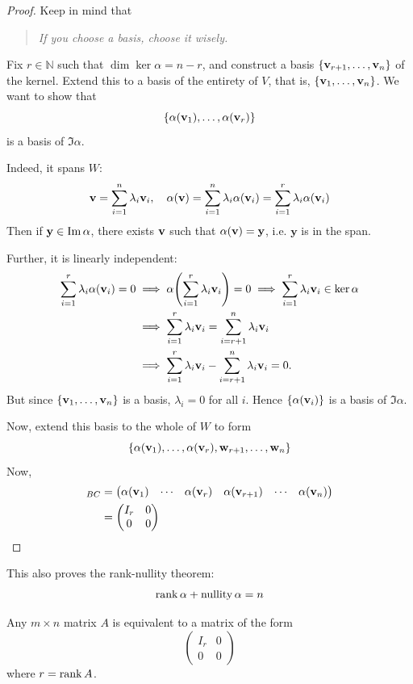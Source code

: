 \documentclass[a4paper,11pt]{article}
\begin{document}
\begin{proof}
    Keep in mind that
    \begin{quotation}
        \textit{If you choose a basis, choose it wisely.}
    \end{quotation}
	Fix $ r \in \mathbb N $ such that $ \dim \ker \alpha = n - r $,
	and construct a basis $ \qty{{\bf v}_{r+1}, \dots, {\bf v}_n} $ of the kernel.
	Extend this to a basis of the entirety of $ V $, that is, $ \qty{{\bf v}_1,\dots,{\bf v}_n} $.
    We want to show that
	\[
		\qty{\alpha({\bf v}_1), \dots, \alpha({\bf v}_r)}
	\]
	is a basis of $ \Im \alpha $.

	Indeed, it spans $W$:
	\[
        {\bf v}         = \sum_{i=1}^n \lambda_i {\bf v}_i,         \quad
		\alpha({\bf v}) = \sum_{i=1}^n \lambda_i \alpha({\bf v}_i)
		          = \sum_{i=1}^r \lambda_i \alpha({\bf v}_i)
    \]
	Then if $ {\bf y} \in \Im \alpha $, there exists $ {\bf v} $ such that $ \alpha({\bf v}) = {\bf y} $, i.e. $ \mathbf{y} $ is in the span.

	Further, it is linearly independent:
	\begin{align*}
		\sum_{i=1}^r \lambda_i \alpha({\bf v}_i) = 0&\implies
		\alpha\qty(\sum_{i=1}^r \lambda_i {\bf v}_i)= 0 \implies
		\sum_{i=1}^r \lambda_i {\bf v}_i \in \ker \alpha \\
        &\implies \sum_{i=1}^r \lambda_i {\bf v}_i = \sum_{i=r+1}^n \lambda_i {\bf v}_i \\
		&\implies \sum_{i=1}^r \lambda_i {\bf v}_i - \sum_{i=r+1}^n \lambda_i {\bf v}_i  = 0.
	\end{align*}
	But since $ \qty{{\bf v}_1, \dots, {\bf v}_n} $ is a basis, $ \lambda_i = 0 $ for all $ i $.
	Hence $ \qty{\alpha({\bf v}_i)} $ is a basis of $ \Im \alpha $.

	Now, extend this basis to the whole of $ W $ to form
	\[
		\qty{\alpha({\bf v}_1), \dots, \alpha({\bf v}_r), {\bf w}_{r+1}, \dots, {\bf w}_n}
	\]
	Now,
	\begin{align*}
		[\alpha]_{BC} & = \begin{pmatrix}
			\alpha(\bfv_1) & \cdots & \alpha(\bfv_r) & \alpha(\bfv_{r+1}) & \cdots & \alpha(\bfv_n)
		\end{pmatrix} \\
		              & = \begin{pmatrix}
			I_r & 0 \\
			0   & 0
		\end{pmatrix}\qedhere
	\end{align*}
\end{proof}
\begin{remark}
	This also proves the rank-nullity theorem:
	\[
		\rank \alpha + \operatorname{nullity} \alpha = n
	\]
\end{remark}
\begin{corollary}
	Any $ m \times n $ matrix $ A $ is equivalent to a matrix of the form
	\[
		\begin{pmatrix}
			I_r & 0 \\
			0   & 0
		\end{pmatrix}
	\]
	where $ r = \rank A $.
\end{corollary}
\end{document}
